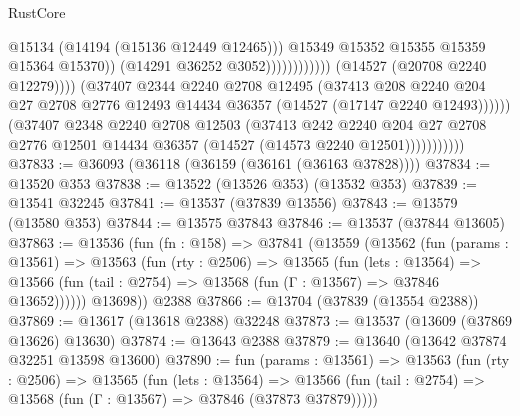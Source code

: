 \begin{lexlean}{RustCore}
\begin{coremodule}
                                                      @15134
                                                      (@14194 (@15136 @12449 @12465)))
                                                    @15349
                                                    @15352
                                                    @15355
                                                    @15359
                                                    @15364
                                                    @15370))
                                                (@14291 @36252 @3052))))))))))))
                          (@14527 (@20708 @2240 @12279))))
                      (@37407
                        @2344
                        @2240
                        @2708
                        @12495
                        (@37413
                          @208
                          @2240
                          @204
                          @27
                          @2708
                          @2776
                          @12493
                          @14434
                          @36357
                          (@14527 (@17147 @2240 @12493))))))
                  (@37407
                    @2348
                    @2240
                    @2708
                    @12503
                    (@37413
                      @242
                      @2240
                      @204
                      @27
                      @2708
                      @2776
                      @12501
                      @14434
                      @36357
                      (@14527 (@14573 @2240 @12501)))))))))))
@37833 := @36093 (@36118 (@36159 (@36161 (@36163 @37828))))
@37834 := @13520 @353
@37838 := @13522 (@13526 @353) (@13532 @353)
@37839 := @13541 @32245
@37841 := @13537 (@37839 @13556)
@37843 := @13579 (@13580 @353)
@37844 := @13575 @37843
@37846 := @13537 (@37844 @13605)
@37863 := @13536
    (fun (fn : @158) =>
    @37841
      (@13559
        (@13562
          (fun (params : @13561) =>
          @13563
            (fun (rty : @2506) =>
            @13565
              (fun (lets : @13564) =>
              @13566 (fun (tail : @2754) => @13568 (fun (Γ : @13567) => @37846 @13652))))))
        @13698))
    @2388
@37866 := @13704 (@37839 (@13554 @2388))
@37869 := @13617 (@13618 @2388) @32248
@37873 := @13537 (@13609 (@37869 @13626) @13630)
@37874 := @13643 @2388
@37879 := @13640 (@13642 @37874 @32251 @13598 @13600)
@37890 := fun (params : @13561) =>
  @13563
    (fun (rty : @2506) =>
    @13565
      (fun (lets : @13564) =>
      @13566 (fun (tail : @2754) => @13568 (fun (Γ : @13567) => @37846 (@37873 @37879)))))

\end{coremodule}
\end{lexlean}
